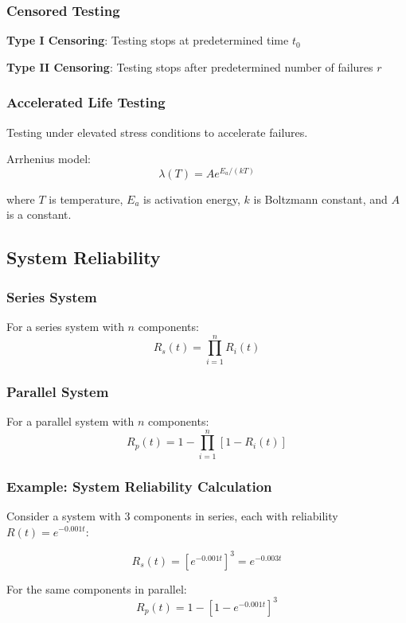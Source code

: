 \documentclass[twoside]{book}
\begin{document}
\subsubsection{Censored Testing}

\textbf{Type I Censoring}: Testing stops at predetermined time $t_0$

\textbf{Type II Censoring}: Testing stops after predetermined number of failures $r$

\subsubsection{Accelerated Life Testing}

Testing under elevated stress conditions to accelerate failures.

Arrhenius model:
$$\lambda(T) = A e^{E_a/(kT)}$$

where $T$ is temperature, $E_a$ is activation energy, $k$ is Boltzmann constant, and $A$ is a constant.

\subsection{System Reliability}

\subsubsection{Series System}

For a series system with $n$ components:
$$R_s(t) = \prod_{i=1}^{n} R_i(t)$$

\subsubsection{Parallel System}

For a parallel system with $n$ components:
$$R_p(t) = 1 - \prod_{i=1}^{n} [1 - R_i(t)]$$

\subsubsection{Example: System Reliability Calculation}

Consider a system with 3 components in series, each with reliability $R(t) = e^{-0.001t}$:

$$R_s(t) = [e^{-0.001t}]^3 = e^{-0.003t}$$

For the same components in parallel:
$$R_p(t) = 1 - [1 - e^{-0.001t}]^3$$
\end{document}
